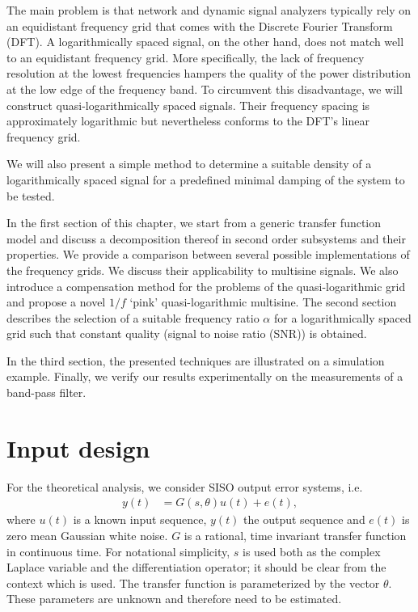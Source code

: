  The main problem is that network and dynamic signal analyzers typically
  rely on an equidistant frequency grid that comes with the Discrete Fourier Transform (DFT).
  A logarithmically spaced signal, on the other hand, does not match well to an equidistant frequency grid.
  More specifically, the lack of frequency resolution at the lowest frequencies hampers the quality of the power distribution at the low edge of the frequency band.
  To circumvent this disadvantage, we will construct quasi-logarithmically spaced signals.
  Their frequency spacing is approximately logarithmic but nevertheless conforms to the DFT's linear frequency grid.

  We will also present a simple method to determine a suitable density of a logarithmically spaced signal for a predefined minimal damping of the system to be tested.

  In the first section of this chapter, we start from a generic transfer function model and discuss a decomposition thereof in second order subsystems and their properties.
  We provide a comparison between several possible implementations of the frequency grids.
  We discuss their applicability to multisine signals.
  We also introduce a compensation method for the problems of the quasi-logarithmic grid and propose a novel $1/f$ `pink' quasi-logarithmic multisine.
  The second section describes the selection of a suitable frequency ratio $\alpha$ for a logarithmically spaced grid such that constant quality (signal to noise ratio (SNR)) is obtained.

  In the third section, the presented techniques are illustrated on a simulation example.
  Finally, we verify our results experimentally on the measurements of a band-pass filter.

\section{Input design}\label{sec:excitation:inputDesign}
For the theoretical analysis, we consider SISO output error systems, i.e.
\begin{align}
y(t) &=G(s,\theta)u(t)  + e(t),
\end{align}
where $u(t)$ is a known input sequence, $y(t)$ the output sequence and $e(t)$ is zero mean Gaussian white noise.
$G$ is a rational, time invariant transfer function in continuous time. 
For notational simplicity, $s$ is used both as the complex Laplace variable and the differentiation operator; it should be clear from the context which is used. 
The transfer function is parameterized by the vector $\theta$.
These parameters are unknown and therefore need to be estimated. 

